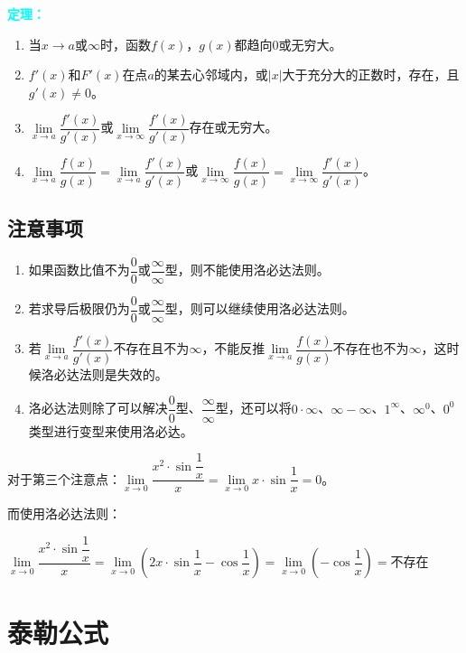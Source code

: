 \documentclass[UTF8, 12pt]{ctexart}
\begin{document}
        \textcolor{aqua}{\textbf{定理：}}

        \begin{enumerate}
            \item 当$x\to a\text{或}\infty$时，函数$f(x)$，$g(x)$都趋向0或无穷大。
            \item $f'(x)$和$F'(x)$在点$a$的某去心邻域内，或$\vert x\vert$大于充分大的正数时，存在，且$g'(x)\neq 0$。
            \item $\lim\limits_{x\to a}\dfrac{f'(x)}{g'(x)}$或$\lim\limits_{x\to\infty}\dfrac{f'(x)}{g'(x)}$存在或无穷大。
            \item $\lim\limits_{x\to a}\dfrac{f(x)}{g(x)}=\lim\limits_{x\to a}\dfrac{f'(x)}{g'(x)}$或$\lim\limits_{x\to\infty}\dfrac{f(x)}{g(x)}=\lim\limits_{x\to\infty}\dfrac{f'(x)}{g'(x)}$。
        \end{enumerate}

        \subsection{注意事项}

        \begin{enumerate}
            \item 如果函数比值不为$\dfrac{0}{0}$或$\dfrac{\infty}{\infty}$型，则不能使用洛必达法则。
            \item 若求导后极限仍为$\dfrac{0}{0}$或$\dfrac{\infty}{\infty}$型，则可以继续使用洛必达法则。
            \item 若$\lim\limits_{x\to a}\dfrac{f'(x)}{g'(x)}$不存在且不为$\infty$，不能反推$\lim\limits_{x\to a}\dfrac{f(x)}{g(x)}$不存在也不为$\infty$，这时候洛必达法则是失效的。
            \item 洛必达法则除了可以解决$\dfrac{0}{0}$型、$\dfrac{\infty}{\infty}$型，还可以将$0\cdot\infty$、$\infty-\infty$、$1^\infty$、$\infty^0$、$0^0$类型进行变型来使用洛必达。
        \end{enumerate}

        对于第三个注意点：$\lim\limits_{x\to 0}\dfrac{x^2\cdot\sin\dfrac{1}{x}}{x}=\lim\limits_{x\to 0}x\cdot\sin\dfrac{1}{x}=0$。

        而使用洛必达法则：\medskip

        $\lim\limits_{x\to 0}\dfrac{x^2\cdot\sin\dfrac{1}{x}}{x}=\lim\limits_{x\to 0}\left(2x\cdot\sin\dfrac{1}{x}-\cos\dfrac{1}{x}\right)=\lim\limits_{x\to 0}\left(-\cos\dfrac{1}{x}\right)=\text{不存在}$

        \section{泰勒公式}
\end{document}
